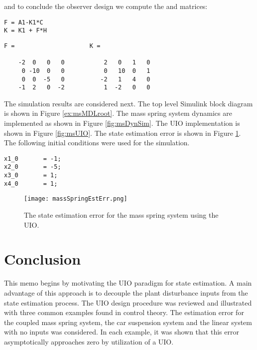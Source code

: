 \documentclass{amsart}
\theoremstyle{definition}
\theoremstyle{remark}
\numberwithin{equation}{section}
\begin{document}
and to conclude the observer design we compute the  and  matrices:
    \begin{verbatim}
F = A1-K1*C
K = K1 + F*H
\end{verbatim}

        \color{lightgray} \begin{verbatim}
F =                     K = 

    -2  0   0   0           2   0   1   0
     0 -10  0   0           0   10  0   1
     0  0  -5   0          -2   1   4   0
    -1  2   0  -2           1  -2   0   0 
\end{verbatim} \color{black}
The simulation results are considered next.  The top level Simulink block diagram is shown in Figure \ref{ex:msMDLroot}.  The mass spring system dynamics are implemented as shown in Figure \ref{fig:msDynSim}. The UIO implementation is shown in Figure \ref{fig:msUIO}. The state estimation error is shown in Figure \ref{fig:UIOerr}. The following initial conditions were used for the simulation. 

\begin{verbatim}
x1_0       = -1;
x2_0       = -5;
x3_0       = 1;
x4_0       = 1; 
\end{verbatim}

\begin{figure}[H]
    \centering
    \texttt{[image: massSpringEstErr.png]}
    \caption{The state estimation error for the mass spring system using the UIO.}
    \label{fig:UIOerr}
\end{figure}
\section{Conclusion}
This memo begins by motivating the UIO paradigm for state estimation.  A main advantage of this approach is to decouple the plant disturbance inputs from the state estimation process.  The UIO design procedure was reviewed and illustrated with three common examples found in control theory.  The estimation error for the coupled mass spring system, the car suspension system and the linear system with no inputs was considered. In each example, it was shown that this error asymptotically approaches zero by utilization of a UIO.












\end{document}
